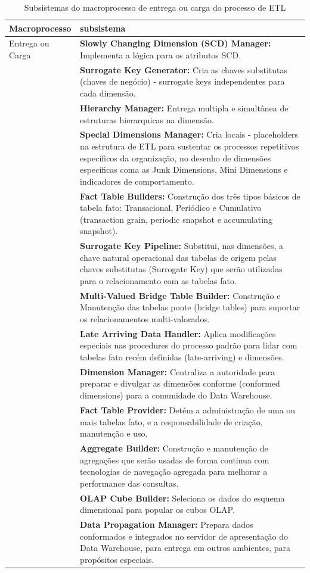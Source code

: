 \begin{table}[h]
	\centering
	\caption{Subsistemas do macroprocesso de entrega ou carga do processo de ETL}
	\label{subcarga}
	\begin{tabular}{|p{3cm}| p{11cm} |}
		\hline
		Macroprocesso & subsistema\\
		\hline
		Entrega ou Carga & \textbf{Slowly Changing Dimension (SCD) Manager:} Implementa a lógica para os atributos SCD. \\
		& \textbf{Surrogate Key Generator:} Cria as chaves substitutas (chaves de negócio) - surrogate keys independentes para cada dimensão.  \\
		& \textbf{Hierarchy Manager:} Entrega multipla e simultânea de estruturas hierarquicas na dimensão. \\
		& \textbf{Special Dimensions Manager:} Cria locais - placeholders na estrutura de ETL para sustentar os processos repetitivos específicos da organização, no desenho de dimensões específicas coma as Junk Dimensions, Mini Dimensions e indicadores de comportamento. \\
		& \textbf{Fact Table Builders:} Construção dos três tipos básicos de tabela fato: Transacional, Periódico e Cumulativo (transaction grain, periodic snapshot e accumulating snapshot). \\
		& \textbf{Surrogate Key Pipeline:} Substitui, nas dimensões, a chave natural operacional das tabelas de origem pelas chaves substitutas (Surrogate Key) que serão utilizadas para o relacionamento com as tabelas fato.  \\
		& \textbf{Multi-Valued Bridge Table Builder:} Construção e Manutenção das tabelas ponte (bridge tables) para suportar os relacionamentos multi-valorados. \\
		& \textbf{Late Arriving Data Handler:} Aplica modificações especiais nas procedures do processo padrão para lidar com tabelas fato recém definidas (late-arriving)  e dimensões. \\
		& \textbf{Dimension Manager:} Centraliza a autoridade para preparar e divulgar as dimensões conforme (conformed dimensions) para a comunidade do Data Warehouse.  \\
		& \textbf{Fact Table Provider:} Detém a administração de uma ou mais tabelas fato, e a responsabilidade de criação, manutenção e uso. \\
		& \textbf{Aggregate Builder:} Construção e manutenção de agregações que serão usadas de forma continua com tecnologias de navegação agregada para melhorar a  performance das consultas.  \\
		& \textbf{OLAP Cube Builder:} Seleciona os dados do esquema dimensional para popular os cubos OLAP. \\
		& \textbf{Data Propagation Manager:} Prepara dados conformados e integrados no servidor de apresentação do Data Warehouse, para entrega em outros ambientes, para propósitos especiais. \\
		\hline
		
	\end{tabular}
\end{table}

